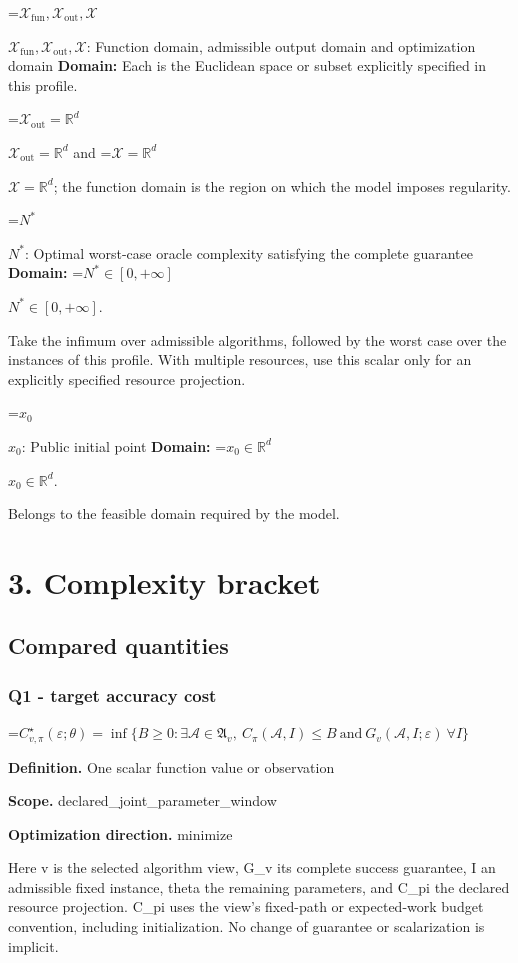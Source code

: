 \documentclass[10pt,a4paper]{article}
\newcommand{\AtlasMath}[1]{\par\begingroup\centering\setbox0=\hbox{$\displaystyle #1$}\ifdim\wd0>1.4\linewidth\typeout{ATLAS WIDE FORMULA: \the\wd0}\fi\ifdim\wd0>\linewidth\resizebox{\linewidth}{!}{\box0}\else\box0\fi\par\endgroup}
\newcommand{\AtlasInlineMath}[1]{\begingroup\setbox0=\hbox{$#1$}\ifdim\wd0>.4\linewidth\endgroup\AtlasMath{#1}\else\endgroup$#1$\fi}
\begin{document}
\AtlasInlineMath{\mathcal{X}_{\mathrm{fun}},\mathcal{X}_{\mathrm{out}},\mathcal{X}}: Function domain, admissible output domain and optimization domain \textbf{Domain:} Each is the Euclidean space or subset explicitly specified in this profile.

\AtlasInlineMath{\mathcal{X}_{\mathrm{out}}=\mathbb{R}^d} and \AtlasInlineMath{\mathcal{X}=\mathbb{R}^d}; the function domain is the region on which the model imposes regularity.

\AtlasInlineMath{N^*}: Optimal worst-case oracle complexity satisfying the complete guarantee \textbf{Domain:} \AtlasInlineMath{N^*\in[0,+\infty]}.

Take the infimum over admissible algorithms, followed by the worst case over the instances of this profile. With multiple resources, use this scalar only for an explicitly specified resource projection.

\AtlasInlineMath{x_0}: Public initial point \textbf{Domain:} \AtlasInlineMath{x_0\in\mathbb{R}^d}.

Belongs to the feasible domain required by the model.

\section{3. Complexity bracket}
\subsection{Compared quantities}
\subsubsection{Q1 - target accuracy cost}
\AtlasMath{C^\star_{v,\pi}(\varepsilon;\theta)=\inf\{B\ge0:\exists\mathcal A\in\mathfrak A_v,\ C_\pi(\mathcal A,I)\le B\ \text{and}\ G_v(\mathcal A,I;\varepsilon)\ \forall I\}}
\textbf{Definition.} One scalar function value or observation

\textbf{Scope.} declared\_joint\_parameter\_window

\textbf{Optimization direction.} minimize

Here v is the selected algorithm view, G\_v its complete success guarantee, I an admissible fixed instance, theta the remaining parameters, and C\_pi the declared resource projection. C\_pi uses the view's fixed-path or expected-work budget convention, including initialization. No change of guarantee or scalarization is implicit.
\end{document}
